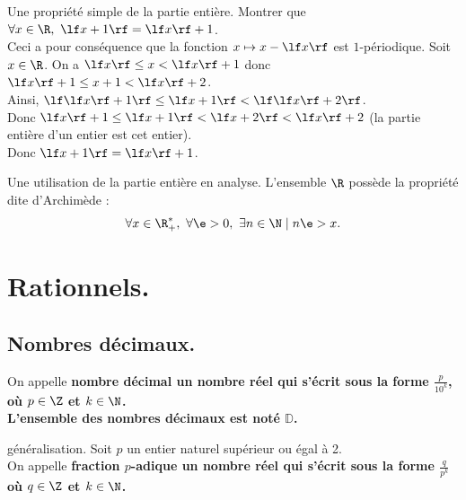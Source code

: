 \documentclass[11pt]{article}
\renewcommand*{\D}{\mathbb{D}}
\begin{document}
\begin{ex}{Une propriété simple de la partie entière.}{}
    Montrer que $\forall x \in \R, ~ \lf x + 1 \rf = \lf x \rf + 1$.\\
    Ceci a pour conséquence que la fonction $x\mapsto x-\lf x \rf$ est $1$-périodique.
    \tcblower
    Soit $x\in\R$. On a $\lf x \rf \leq x < \lf x \rf + 1$ donc $\lf x \rf + 1 \leq x+1 < \lf x \rf + 2$.\\
    Ainsi, $\lf\lf x \rf + 1 \rf \leq \lf x + 1 \rf < \lf \lf x \rf + 2 \rf$.\\
    Donc $\lf x \rf + 1 \leq \lf x+1 \rf < \lf x + 2 \rf<\lf x \rf + 2$  (la partie entière d'un entier est cet entier).\\
    Donc $\lf x + 1 \rf = \lf x \rf + 1$.
\end{ex}

\begin{lemme}{Une utilisation de la partie entière en analyse.}{}
    L'ensemble $\R$ possède la propriété dite d'Archimède :
    \begin{equation*}
        \forall x \in \R_+^*,~\forall \e>0,~\exists n\in\N \mid n\e>x.
    \end{equation*}
\end{lemme}

\section{Rationnels.}

\subsection{Nombres décimaux.}

\begin{defi}{}{}
    On appelle \bf{nombre décimal} un nombre réel qui s'écrit sous la forme $\frac{p}{10^k}$, où $p\in\Z$ et $k\in\N$.\\
    L'ensemble des nombres décimaux est noté $\D$.
\end{defi}

\vspace*{-0.5cm}

\begin{defi}{généralisation.}{}
    Soit $p$ un entier naturel supérieur ou égal à 2.\\
    On appelle \bf{fraction $p$-adique} un nombre réel qui s'écrit sous la forme $\frac{q}{p^k}$ où $q\in\Z$ et $k\in\N$.
\end{defi}
\end{document}
